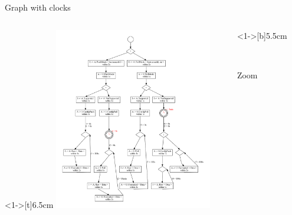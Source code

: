 \documentclass[8 pt]{beamer}
\begin{document}


\begin{frame}{Graph with clocks}
\begin{columns}
\begin{column}<1->[t]{6.5cm}
\includegraphics[height=8cm]{DataAcquisitionExample}
\end{column}
\begin{column}<1->[b]{5.5cm}

\\
\begin{center}
Zoom
\end{center}
~~\\~~\\~~\\
\end{column}
\end{columns}
\end{frame}
\end{document}
